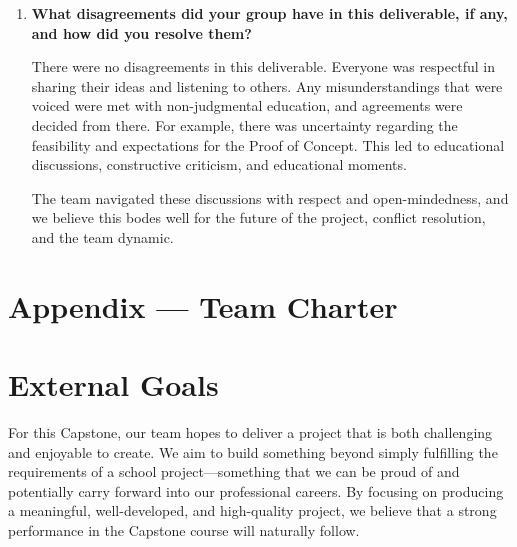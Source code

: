 \documentclass{article}
\begin{document}
\begin{enumerate}
    \indent It can also help to prevent bugs from unknowingly arising when changes are made to existing code and disrupting code that was previously written off as meeting requirements and passing test cases. This is especially useful in a project with many collaborators and on complex projects, as small bugs introduced can be hard to catch and to pinpoint when they were introduced.

    \indent However, CI/CD can be complicated to implement and can add to project overhead.

    \indent As a group, we have decided to implement guidelines that must be followed when merging a branch into Main (no conflicts, at least one reviewer), the existing automatic PDF generator (with potential modifications as the project progresses), and the addition of unit testing where deemed necessary. We may choose to add more CI/CD elements to the project in the future, at the discretion of the group.

    \item \textbf{What disagreements did your group have in this deliverable, if any, and how did you resolve them?}

    \indent There were no disagreements in this deliverable. Everyone was respectful in sharing their ideas and listening to others. Any misunderstandings that were voiced were met with non-judgmental education, and agreements were decided from there. For example, there was uncertainty regarding the feasibility and expectations for the Proof of Concept. This led to educational discussions, constructive criticism, and educational moments.

    \indent The team navigated these discussions with respect and open-mindedness, and we believe this bodes well for the future of the project, conflict resolution, and the team dynamic.
\end{enumerate}

\newpage{}

\section*{Appendix --- Team Charter}
\section*{External Goals}

For this Capstone, our team hopes to deliver a project that is both challenging and enjoyable to create. We aim to build something beyond simply fulfilling the requirements of a school project---something that we can be proud of and potentially carry forward into our professional careers. By focusing on producing a meaningful, well-developed, and high-quality project, we believe that a strong performance in the Capstone course will naturally follow.
\end{document}

